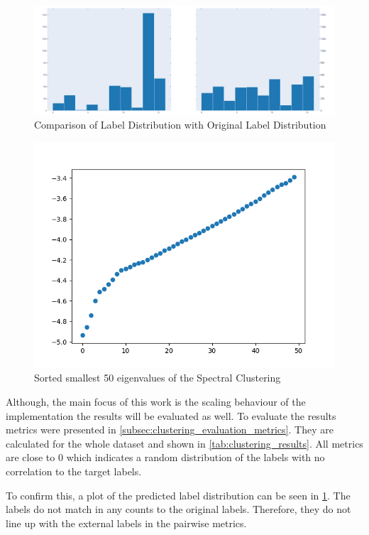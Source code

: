   \begin{figure}
    \centering
    \includegraphics[width=0.9\linewidth]{images/label_distribution.png}
    \caption{Comparison of Label Distribution with Original Label Distribution}
    \label{fig:label_distribution}
  \end{figure}

  \begin{figure}
    \centering
    \includegraphics[width=0.9\linewidth]{images/eigenvalues.png}
    \caption{Sorted smallest 50 eigenvalues of the Spectral Clustering}
    \label{fig:eigenvalues}
  \end{figure}



Although, the main focus of this work is the scaling behaviour of the implementation the results will be evaluated as
well. To evaluate the results metrics were presented in \cref{subsec:clustering_evaluation_metrics}.
They are calculated for the whole dataset and shown in \cref{tab:clustering_results}.
All metrics are close to \(0\) which indicates a random distribution of the labels with no correlation to the target
labels.

To confirm this, a plot of the predicted label distribution can be seen in \cref{fig:label_distribution}.
The labels do not match in any counts to the original labels. Therefore, they do not line up with the external labels
in the pairwise metrics.

